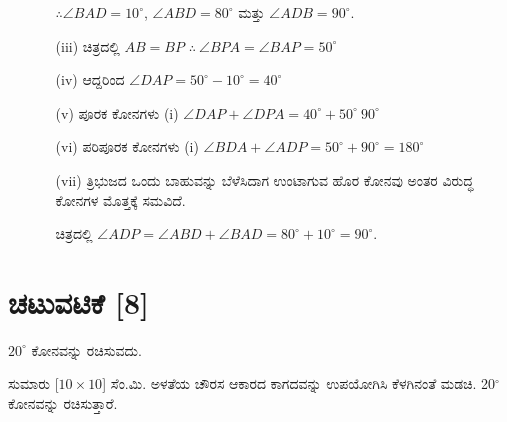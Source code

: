 \begin{enumerate}
\begin{itemize}
$\therefore \angle BAD = 10^\circ$, $\angle ABD = 80^\circ$ ಮತ್ತು $\angle ADB = 90^\circ$.

\item[(iii)] ಚಿತ್ರದಲ್ಲಿ $AB = BP$ \quad $\therefore ~ \angle BPA = \angle BAP = 50^\circ$

\item[(iv)] ಆದ್ದರಿಂದ $\angle DAP = 50^\circ - 10^\circ = 40^\circ$

\item[(v)] ಪೂರಕ ಕೋನಗಳು (i) $\angle DAP + \angle DPA = 40^\circ + 50^\circ \ 90^\circ$

\item[(vi)] ಪರಿಪೂರಕ ಕೋನಗಳು  (i) $\angle BDA + \angle ADP = 50^\circ + 90^\circ = 180^\circ $

\item[(vii)] ತ್ರಿಭುಜದ ಒಂದು ಬಾಹುವನ್ನು ಬೆಳೆಸಿದಾಗ ಉಂಟಾಗುವ ಹೊರ ಕೋನವು ಅಂತರ ವಿರುದ್ಧ ಕೋನಗಳ ಮೊತ್ತಕ್ಕೆ ಸಮವಿದೆ. 

ಚಿತ್ರದಲ್ಲಿ $\angle ADP = \angle ABD + \angle BAD = 80^\circ + 10^\circ = 90^\circ$.
\end{itemize}
\end{enumerate}

\section*{ಚಟುವಟಿಕೆ [8]} $20^\circ$ ಕೋನವನ್ನು ರಚಿಸುವದು. 

ಸುಮಾರು [$10 \times 10$] ಸೆಂ.ಮಿ. ಅಳತೆಯ ಚೌರಸ ಆಕಾರದ ಕಾಗದವನ್ನು ಉಪಯೋಗಿಸಿ ಕೆಳಗಿನಂತೆ ಮಡಚಿ.  20$^\circ$ ಕೋನವನ್ನು ರಚಿಸುತ್ತಾರೆ. 

